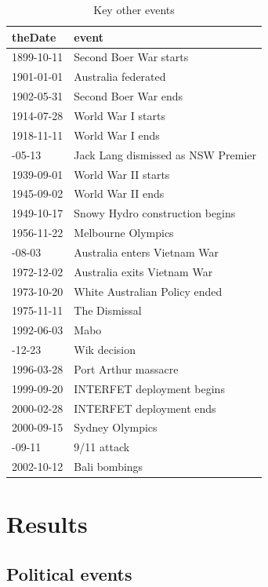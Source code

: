 \documentclass[12pt,]{article}
\theoremstyle{definition}
\theoremstyle{definition}
\theoremstyle{definition}
\theoremstyle{remark}
\begin{document}
\begin{table}

\caption{\label{tab:otherevents}Key other events}
\centering
\fontsize{8}{10}\selectfont
\begin{tabular}[t]{ll}
\toprule
theDate & event\\
\midrule
1899-10-11 & Second Boer War starts\\
1901-01-01 & Australia federated\\
1902-05-31 & Second Boer War ends\\
1914-07-28 & World War I starts\\
1918-11-11 & World War I ends\\
\addlinespace
1932-05-13 & Jack Lang dismissed as NSW Premier\\
1939-09-01 & World War II starts\\
1945-09-02 & World War II ends\\
1949-10-17 & Snowy Hydro construction begins\\
1956-11-22 & Melbourne Olympics\\
\addlinespace
1962-08-03 & Australia enters Vietnam War\\
1972-12-02 & Australia exits Vietnam War\\
1973-10-20 & White Australian Policy ended\\
1975-11-11 & The Dismissal\\
1992-06-03 & Mabo\\
\addlinespace
1996-12-23 & Wik decision\\
1996-03-28 & Port Arthur massacre\\
1999-09-20 & INTERFET deployment begins\\
2000-02-28 & INTERFET deployment ends\\
2000-09-15 & Sydney Olympics\\
\addlinespace
2001-09-11 & 9/11 attack\\
2002-10-12 & Bali bombings\\
\bottomrule
\end{tabular}
\end{table}

\section{Results}\label{results}

\subsection{Political events}\label{political-events}
\end{document}
